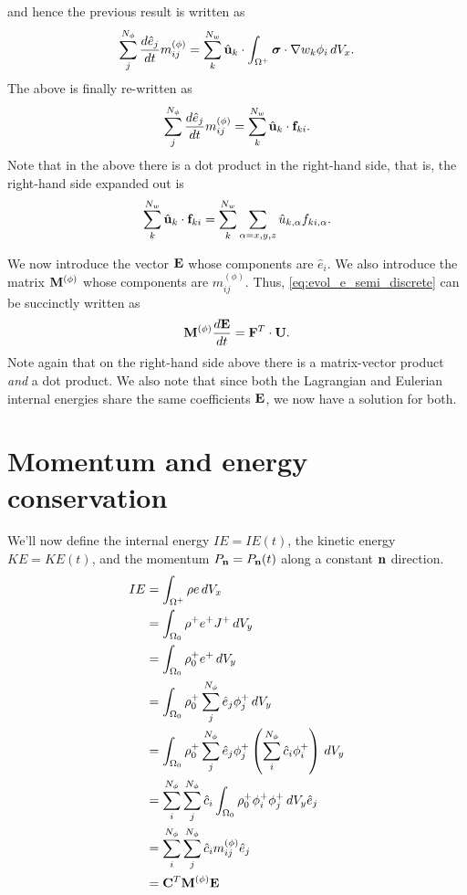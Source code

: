 \documentclass[11pt]{report}
\begin{document}
and hence the previous result is written as
\begin{equation}
    \sum_j^{N_\phi} \frac{d \hat{e}_j}{dt} m_{ij}^{(\phi)} = \sum_k^{N_w} \hat{\mathbf{u}}_k \cdot \int_{\Omega^+} \bm \sigma \cdot \nabla w_k \phi_i \, dV_x.
\end{equation}
The above is finally re-written as
\begin{equation}
    \label{eq:evol_e_semi_discrete}
    \sum_j^{N_\phi} \frac{d \hat{e}_j}{d t} m^{(\phi)}_{ij} = \sum_k^{N_w} \hat{\mathbf{u}}_k \cdot \mathbf{f}_{ki}.
\end{equation}
Note that in the above there is a dot product in the right-hand side, that is, the right-hand side expanded out is  
\begin{equation}
    \sum_k^{N_w} \hat{\mathbf{u}}_k \cdot \mathbf{f}_{ki} = \sum_k^{N_w} \sum_{\alpha=x,y,z} \hat{u}_{k,\alpha} f_{ki,\alpha}.
\end{equation}

We now introduce the vector $\mathbf{E}$ whose components are $\hat{e}_i$. We also introduce the matrix $\mathbf{M}^{(\phi)}$ whose components are $m_{ij}^{(\phi)}$. Thus, \cref{eq:evol_e_semi_discrete} can be succinctly written as
\begin{equation}
    \label{eq:evol_energy_semi_discrete}
    \mathbf{M}^{(\phi)} \frac{d\mathbf{E}}{dt} = \mathbf{F}^T \cdot \mathbf{U}.
\end{equation}
Note again that on the right-hand side above there is a matrix-vector product \textit{and} a dot product. We also note that since both the Lagrangian and Eulerian internal energies share the same coefficients $\mathbf{E}$, we now have a solution for both.

\section{Momentum and energy conservation}
We'll now define the internal energy $IE=IE(t)$, the kinetic energy $KE=KE(t)$, and the momentum $P_{\mathbf{n}}=P_{\mathbf{n}}(t)$ along a constant $\mathbf{n}$ direction.
\begin{align}
    IE &= \int_{\Omega^+} \rho e \, dV_x \nonumber \\
    &= \int_{\Omega_0} \rho^+ e^+ J^+ \, dV_y \nonumber \\
    &= \int_{\Omega_0} \rho^+_0 e^+ \, dV_y \nonumber \\
    &= \int_{\Omega_0} \rho_0^+ \sum_{j}^{N_\phi} \hat{e}_j \phi_j^+ \, dV_y \nonumber \\
    &= \int_{\Omega_0} \rho_0^+ \sum_{j}^{N_\phi} \hat{e}_j \phi_j^+ \left ( \sum_{i}^{N_\phi} \hat{c}_i \phi^+_i \right ) \, dV_y \nonumber \\
    &= \sum_i^{N_\phi} \sum_j^{N_\phi} \hat{c}_i \int_{\Omega_0} \rho_0^+ \phi_i^+ \phi_j^+ \, dV_y \hat{e}_j \nonumber \\
    &= \sum_i^{N_\phi} \sum_j^{N_\phi} \hat{c}_i m_{ij}^{(\phi)} \hat{e}_j \nonumber \\
    &= \mathbf{C}^T \mathbf{M}^{(\phi)} \mathbf{E} 
\end{align}
\end{document}
